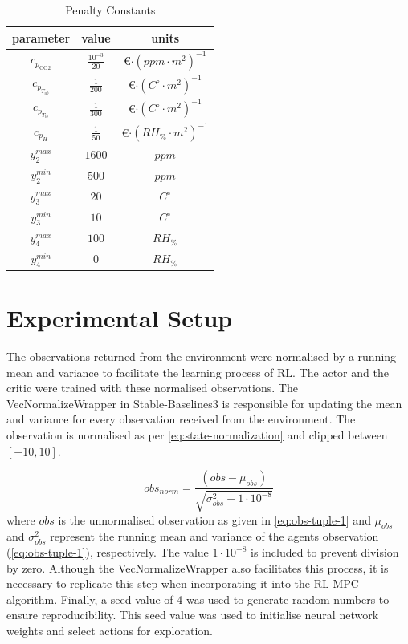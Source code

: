 \begin{table}[h]
    \centering
    \begin{tabular}{|c|c|c|}
    \hline
         parameter& value & units  \\
    \hline
        $c_{p_{\text{CO2}}}$ &$\frac{10^{-3}}{20}$ & \euro$\cdot (ppm \cdot m^2)^{-1}$ \\
        $c_{p_{T_{ub}}}$ & $\frac{1}{200}$& \euro$\cdot (C^{\circ} \cdot m^2)^{-1}$\\
        $c_{p_{T_{lb}}}$ & $\frac{1}{300}$& \euro$\cdot (C^{\circ} \cdot m^2)^{-1}$\\
        $c_{p_{H}}$ & $\frac{1}{50}$ & \euro$\cdot (RH_{\%} \cdot m^2)^{-1}$\\
        $y_2^{max}$ & $1600$ & $ppm$ \\
        $y_2^{min}$ & $500$ & $ppm$ \\
        $y_3^{max}$ & $20$ & $C^{\circ}$ \\
        $y_3^{min}$ & $10$ & $C^{\circ}$ \\
        $y_4^{max}$ & $100$ & $RH_{\%}$ \\
        $y_4^{min}$ & $0$ & $RH_{\%}$ \\       
        \hline
    \end{tabular}
    \caption{Penalty Constants}
    \label{tab:pen-constants}
\end{table}



\section{Experimental Setup} \label{section:experimental-setup}
The observations returned from the environment were normalised by a running mean and variance to facilitate the learning process of RL. The actor and the critic were trained with these normalised observations. The VecNormalizeWrapper in Stable-Baselines3 is responsible for updating the mean and variance for every observation received from the environment. The observation is normalised as per \autoref{eq:state-normalization} and clipped between $[-10,10]$.

\begin{equation}\label{eq:state-normalization}
    obs_{norm} = \frac{(obs - \mu_{obs}) }{\sqrt{\sigma^2_{obs} + 1\cdot 10^{-8}}}
\end{equation}
where $obs$ is the unnormalised observation as given in \autoref{eq:obs-tuple-1} and $\mu_{obs}$ and $\sigma^2_{obs}$ represent the running mean and variance of the agents observation (\autoref{eq:obs-tuple-1}), respectively.  The value $1\cdot 10^{-8}$ is included to prevent division by zero. Although the VecNormalizeWrapper also facilitates this process, it is necessary to replicate this step when incorporating it into the RL-MPC algorithm. Finally, a seed value of 4 was used to generate random numbers to ensure reproducibility. This seed value was used to initialise neural network weights and select actions for exploration.

